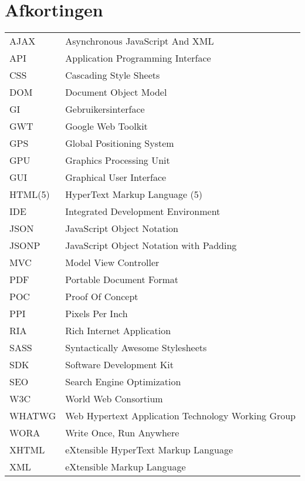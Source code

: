 \documentclass[master=cws,dutch,masteroption={vs,gs}]{kulemt}
\begin{document}
\section*{Afkortingen}
\begin{flushleft}
  \renewcommand{\arraystretch}{1.1}
  \begin{tabularx}{\textwidth}{@{}p{2cm}X@{}}
     AJAX & Asynchronous JavaScript And XML \\
     API & Application Programming Interface \\
     CSS & Cascading Style Sheets \\
     DOM & Document Object Model \\
     GI & Gebruikersinterface \\
     GWT & Google Web Toolkit \\
     GPS & Global Positioning System \\
     GPU & Graphics Processing Unit \\
     GUI & Graphical User Interface \\
     HTML(5) & HyperText Markup Language (5) \\
     IDE & Integrated Development Environment \\
     JSON & JavaScript Object Notation \\
     JSONP & JavaScript Object Notation with Padding \\
     MVC & Model View Controller \\
     PDF & Portable Document Format \\
     POC & Proof Of Concept \\
     PPI & Pixels Per Inch \\
     RIA & Rich Internet Application \\
     SASS & Syntactically Awesome Stylesheets \\
     SDK & Software Development Kit \\
     SEO & Search Engine Optimization \\
     W3C & World Web Consortium \\
     WHATWG & Web Hypertext Application Technology Working Group \\
     WORA & Write Once, Run Anywhere \\
     XHTML & eXtensible HyperText Markup Language \\ 
     XML & eXtensible Markup Language
  \end{tabularx}
\end{flushleft}
\end{document}
